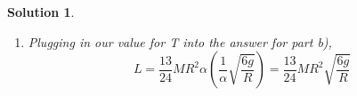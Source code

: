 \documentclass[12pt]{article}
\newtheorem*{solution}{Solution}
\theoremstyle{mystyle}
\begin{document}
\begin{solution}
\begin{enumerate}[\Alph*)]
        $$I_{\text{removed}} = I_{\text{cm, removed}} + \frac{M}{3}(\frac{R}{2})^2 = \frac{1}{8}MR^2$$

        The moment of inertia after the hole is made is then:
        $$I = \frac{2}{3}MR^2 - \frac{1}{8}MR^2 = \frac{13}{24}MR^2$$

        Therefore, the angular momentum is $I\omega = \frac{13}{24}MR^2\omega = \boxed{\frac{13}{24}MR^2\alpha t}$

        \item Plugging in our value for T into the answer for part b),
        $$L = \frac{13}{24}MR^2\alpha \left(\frac{1}{\alpha}\sqrt{\frac{6g}{R}}\right) = \boxed{ \frac{13}{24}MR^2 \sqrt{\frac{6g}{R}}}$$
        
    \end{enumerate}
\end{solution}
\end{document}
